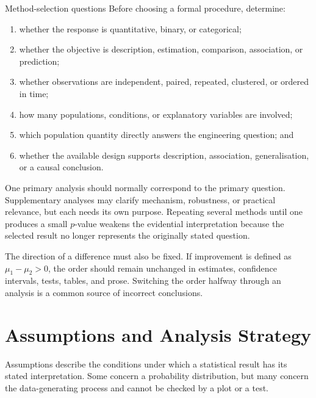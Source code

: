 \begin{custombox}{Method-selection questions}
Before choosing a formal procedure, determine:
\begin{enumerate}
  \item whether the response is quantitative, binary, or categorical;
  \item whether the objective is description, estimation, comparison, association, or prediction;
  \item whether observations are independent, paired, repeated, clustered, or ordered in time;
  \item how many populations, conditions, or explanatory variables are involved;
  \item which population quantity directly answers the engineering question; and
  \item whether the available design supports description, association, generalisation, or a causal conclusion.
\end{enumerate}
\end{custombox}

One primary analysis should normally correspond to the primary question. Supplementary analyses may clarify mechanism, robustness, or practical relevance, but each needs its own purpose. Repeating several methods until one produces a small $p$-value weakens the evidential interpretation because the selected result no longer represents the originally stated question.

The direction of a difference must also be fixed. If improvement is defined as $\mu_1-\mu_2>0$, the order should remain unchanged in estimates, confidence intervals, tests, tables, and prose. Switching the order halfway through an analysis is a common source of incorrect conclusions.

\section{Assumptions and Analysis Strategy}
\label{sec:integrated-assumptions-strategy}

Assumptions describe the conditions under which a statistical result has its stated interpretation. Some concern a probability distribution, but many concern the data-generating process and cannot be checked by a plot or a test.

